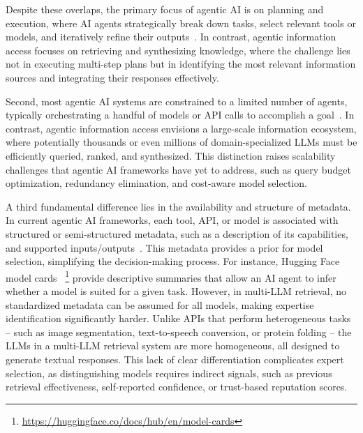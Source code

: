 Despite these overlaps, the primary focus of agentic AI is on planning and execution, where AI agents strategically break down tasks, select relevant tools or models, and iteratively refine their outputs~\cite{li2023camelcommunicativeagentsmind}. In contrast, agentic information access focuses on retrieving and synthesizing knowledge, where the challenge lies not in executing multi-step plans but in identifying the most relevant information sources and integrating their responses effectively.

Second, most agentic AI systems are constrained to a limited number of agents, typically orchestrating a handful of models or API calls to accomplish a goal~\cite{hong2024metagptmetaprogrammingmultiagent, wu2023autogenenablingnextgenllm}. In contrast, agentic information access envisions a large-scale information ecosystem, where potentially thousands or even millions of domain-specialized LLMs must be efficiently queried, ranked, and synthesized. This distinction raises scalability challenges that agentic AI frameworks have yet to address, such as query budget optimization, redundancy elimination, and cost-aware model selection.

A third fundamental difference lies in the availability and structure of metadata. In current agentic AI frameworks, each tool, API, or model is associated with structured or semi-structured metadata, such as a description of its capabilities, and supported inputs/outputs~\cite{xu2023toolbench, li2023apibank}. This metadata provides a prior for model selection, simplifying the decision-making process. For instance, Hugging Face model cards ~\cite{Mitchell2019}\footnote{\url{https://huggingface.co/docs/hub/en/model-cards}} provide descriptive summaries that allow an AI agent to infer whether a model is suited for a given task. However, in multi-LLM retrieval, no standardized metadata can be assumed for all models, making expertise identification significantly harder. Unlike APIs that perform heterogeneous tasks -- such as image segmentation, text-to-speech conversion, or protein folding -- the LLMs in a multi-LLM retrieval system are more homogeneous, all designed to generate textual responses. This lack of clear differentiation complicates expert selection, as distinguishing models requires indirect signals, such as previous retrieval effectiveness, self-reported confidence, or trust-based reputation scores.